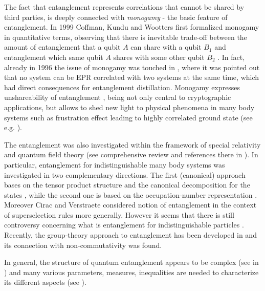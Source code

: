 \documentclass[twocolumn,aps,rmp]{revtex4}
\begin{document}
The fact that entanglement represents correlations that cannot be
shared by third parties, is deeply connected with {\it monogamy} - the
basic feature of entanglement. In 1999 Coffman, Kundu and Wootters
first formalized monogamy in quantitative terms, observing that there
is inevitable trade-off between the amount of entanglement that a
qubit $A$ can share with a qubit $B_1$ and entanglement which same
qubit $A$ shares with some other qubit $B_2$
\cite{CoffmanKW-tangle}. In fact, already in 1996 the issue of
monogamy was touched in \cite{BDSW1996}, where it was pointed out that
no system can be EPR correlated with two systems at the same time,
which had direct consequences for entanglement distillation.  Monogamy
expresses unshareability of entanglement \cite {Terhal1}, being not
only central to cryptographic applications, but allows to shed new
light to physical phenomena in many body systems such as frustration
effect leading to highly correlated ground state (see
e.g. \cite{DawsonN2004-frustration}).

The entanglement was also investigated within the framework of special
relativity and quantum field theory \cite
{SummersW,AlsingM,CabanR,Czachor1,PeresST,Terno,JordanSS} (see
comprehensive review and references there in \cite {PeresTerno}). In
particular, entanglement for indistinguishable many body systems was
investigated in two complementary directions. The first (canonical)
approach bases on the tensor product structure and the canonical
decomposition for the states \cite
{SchliemannCKML-fermion,EckertSBL-fermion,PaskauskasY,LiZLL}, while
the second one is based on the occupation-number representation \cite
{Zanardi,ZanardiW}. Moreover Cirac and Verstraete \cite{VerCir03}
considered notion of entanglement in the context of superselection
rules more generally.  However it seems that there is still
controversy concerning what is entanglement for indistinguishable
particles \cite{WisVac03}. Recently, the group-theory approach to
entanglement has been developed in \cite{KobriczL_grupent2006} and its
connection with non-commutativity was found.

In general, the structure of quantum entanglement appears to be
complex (see in \cite {Gurvits1}) and many various parameters,
measures, inequalities are needed to characterize its different
aspects (see
\cite{BengtssonZyczkowski-book,Alber2001,BrussReview,BrussReflections,Eckert,TerhalReview,DagBook}).
\end{document}
